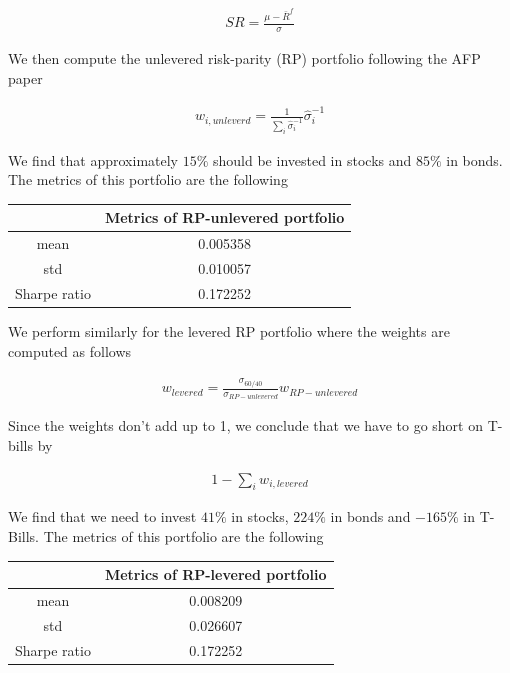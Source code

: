 \documentclass[10pt]{article}
\newenvironment{exercise}[2][Exercise]{\begin{trivlist}
  \item[\hskip \labelsep {\bfseries #1}\hskip \labelsep {\bfseries #2.}]}{\end{trivlist}}
\begin{document}
\begin{exercise}{3}
	\begin{align*}
		SR = \frac{\mu - \bar{R}^{f}}{\sigma}
	\end{align*}
	
	We then compute the unlevered risk-parity (RP) portfolio following the AFP paper
	
	\begin{align*}
		w_{i, unleverd} = \frac{1}{\sum_{i} \hat{\sigma}_{i}^{-1}} \hat{\sigma}^{-1}_{i}
	\end{align*}
	
	We find that approximately $15\%$ should be invested in stocks and $85\%$ in bonds. The metrics of this portfolio are the following
	
	\begin{table}[h!]
		\centering
 		\begin{tabular}{||c c||} 
 			\hline
 			& Metrics of RP-unlevered portfolio \\ [0.5ex] 
 			\hline\hline
 			mean & 0.005358 \\ 
 			std & 0.010057 \\
 			Sharpe ratio & 0.172252 \\ [1ex] 
 			\hline
		 \end{tabular}
	\end{table}	
	
	We perform similarly for the levered RP portfolio where the weights are computed as follows
	
	\begin{align*}
		w_{levered} = \frac{\sigma_{60/40}}{\sigma_{RP-unlevered}} w_{RP-unlevered}
	\end{align*}
	
	Since the weights don't add up to 1, we conclude that we have to go short on T-bills by
	
	\begin{align*}
		1 - \sum_{i} w_{i, levered}
	\end{align*}

	We find that we need to invest $41\%$ in stocks, $224\%$ in bonds and $-165\%$ in T-Bills. The metrics of this portfolio are the following
	
	\begin{table}[h!]
		\centering
 		\begin{tabular}{||c c||} 
 			\hline
 			& Metrics of RP-levered portfolio \\ [0.5ex] 
 			\hline\hline
 			mean & 0.008209 \\ 
 			std & 0.026607 \\
 			Sharpe ratio & 0.172252 \\ [1ex] 
 			\hline
		 \end{tabular}
	\end{table}	


\end{exercise}
\end{document}
